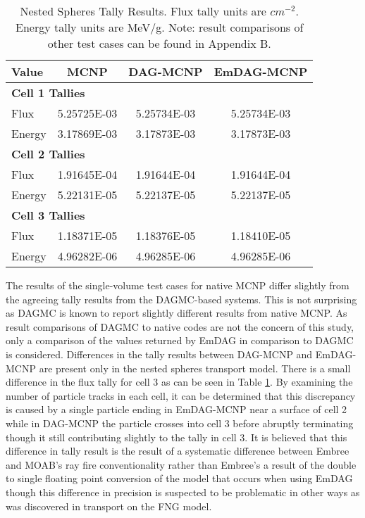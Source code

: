 \begin{table}[H]
  \small
  \begin{center}
    \begin{tabular}{lccc}
      \toprule
      Value & MCNP & DAG-MCNP & EmDAG-MCNP \\
      \toprule
      \multicolumn{4}{l}{\textbf{Cell 1 Tallies}} \\
      \hline
      Flux  & 5.25725E-03 & 5.25734E-03 & 5.25734E-03 \\
      Energy  & 3.17869E-03 &  3.17873E-03 &  3.17873E-03 \\
      \hline
      \multicolumn{4}{l}{\textbf{Cell 2 Tallies}} \\
      \hline
      Flux  & 1.91645E-04 & 1.91644E-04 & 1.91644E-04 \\
      Energy  & 5.22131E-05 & 5.22137E-05 & 5.22137E-05 \\
      \hline
      \multicolumn{4}{l}{\textbf{Cell 3 Tallies}} \\
      \hline
      Flux  & 1.18371E-05 & 1.18376E-05 & 1.18410E-05 \\
      Energy  & 4.96282E-06 & 4.96285E-06 & 4.96285E-06 \\
      \bottomrule
                        
    \end{tabular}
    \caption{Nested Spheres Tally Results. Flux tally units are
      $cm^{-2}$. Energy tally units are MeV/g. Note: result comparisons of other
      test cases can be found in Appendix B.}
    \label{nestedspheres}
  \end{center}
\end{table}


The results of the single-volume test cases for native MCNP differ slightly from
the agreeing tally results from the DAGMC-based systems. This is not surprising
as DAGMC is known to report slightly different results from native MCNP. As
result comparisons of DAGMC to native codes are not the concern of this study,
only a comparison of the values returned by EmDAG in comparison to DAGMC is
considered. Differences in the tally results between DAG-MCNP and EmDAG-MCNP are
present only in the nested spheres transport model. There is a small difference
in the flux tally for cell 3 as can be seen in Table \ref{nestedspheres}. By
examining the number of particle tracks in each cell, it can be determined that
this discrepancy is caused by a single particle ending in EmDAG-MCNP near a
surface of cell 2 while in DAG-MCNP the particle crosses into cell 3 before
abruptly terminating though it still contributing slightly to the tally in cell
3. It is believed that this difference in tally result is the result of a
systematic difference between Embree and MOAB's ray fire conventionality rather
than Embree's a result of the double to single floating point conversion of the
model that occurs when using EmDAG though this difference in precision is
suspected to be problematic in other ways as was discovered in transport on the
FNG model.

